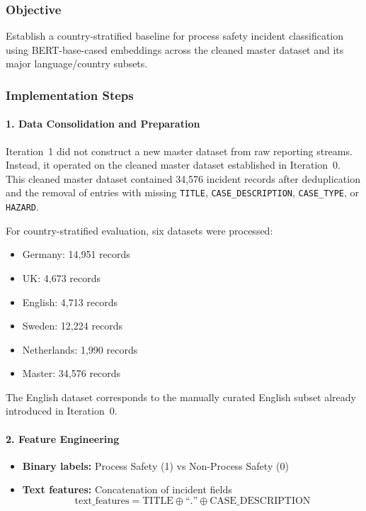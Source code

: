 \documentclass[11pt, titlepage, bibliography=totoc]{scrreprt}
\begin{document}
\subsubsection{Objective}
Establish a country-stratified baseline for process safety incident classification using BERT-base-cased embeddings across the cleaned master dataset and its major language/country subsets.

\subsubsection{Implementation Steps}

\paragraph{1. Data Consolidation and Preparation}
Iteration~1 did not construct a new master dataset from raw reporting streams. Instead, it operated on the cleaned master dataset established in Iteration~0. This cleaned master dataset contained 34,576 incident records after deduplication and the removal of entries with missing \texttt{TITLE}, \texttt{CASE\_DESCRIPTION}, \texttt{CASE\_TYPE}, or \texttt{HAZARD}.

For country-stratified evaluation, six datasets were processed:
\begin{itemize}
    \item Germany: 14,951 records
    \item UK: 4,673 records
    \item English: 4,713 records
    \item Sweden: 12,224 records
    \item Netherlands: 1,990 records
    \item Master: 34,576 records
\end{itemize}

The English dataset corresponds to the manually curated English subset already introduced in Iteration~0.

\paragraph{2. Feature Engineering}
\begin{itemize}
    \item \textbf{Binary labels:} Process Safety (1) vs Non-Process Safety (0)
    \item \textbf{Text features:} Concatenation of incident fields
    \begin{equation}
    \text{text\_features} = \text{TITLE} \oplus \text{``.''}  \oplus \text{CASE\_DESCRIPTION}
    \end{equation}
\end{itemize}
\end{document}
